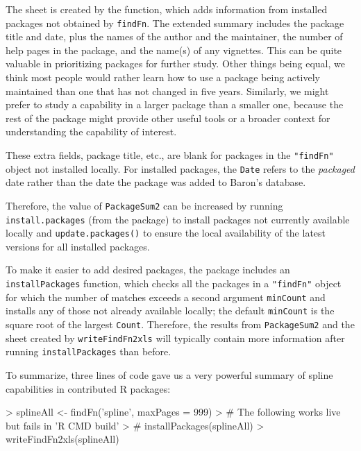 \documentclass[a4paper]{report}
\begin{document}
\begin{article}
The  sheet is created by the
 function, which adds information from
installed packages not obtained by
{\tt findFn}.  The extended summary includes the package title and date, plus
the names of the author and the maintainer, the number of help pages
in the package,
and the name(s) of any vignettes.  This can be quite
valuable in prioritizing packages for further study.
Other things being equal, we think most people would
rather learn how to use a package being actively maintained
than one that has not changed in five years.  Similarly,
we might prefer to study a capability in a larger package
than a smaller one, because the rest of the package might
provide other useful tools or a broader context for
understanding the capability of interest.

These extra fields, package title, etc., are blank for
packages in the {\tt "findFn"} object not installed locally.
For installed packages, the {\tt Date} refers to the \emph{packaged} date rather
than the date the package was added to Baron's database.

Therefore, the value of {\tt PackageSum2} can be
increased by running {\tt install.packages} (from the
 package) to install packages not currently
available locally and {\tt update.packages()} to ensure the
local availability of the latest versions for all
installed packages.

To make it easier to add desired packages,
the  package includes
an {\tt installPackages} function, which checks all the
packages in a {\tt "findFn"} object for which
the number of matches exceeds a second argument {\tt minCount}
and installs any of those not already available locally;  the
default {\tt minCount} is the square root of the largest
{\tt Count}.  Therefore, the results from {\tt PackageSum2} and the
 sheet created by {\tt writeFindFn2xls} will typically
contain more information after running {\tt installPackages}
than before.

To summarize, three lines of code gave us a very powerful
summary of spline capabilities in contributed R
packages:

\begin{Schunk}
\begin{Sinput}
> splineAll <- findFn('spline', maxPages = 999)
> # The following works live but fails in 'R CMD build'
> # installPackages(splineAll)
> writeFindFn2xls(splineAll)
\end{Sinput}
\end{Schunk}


\end{article}
\end{document}
